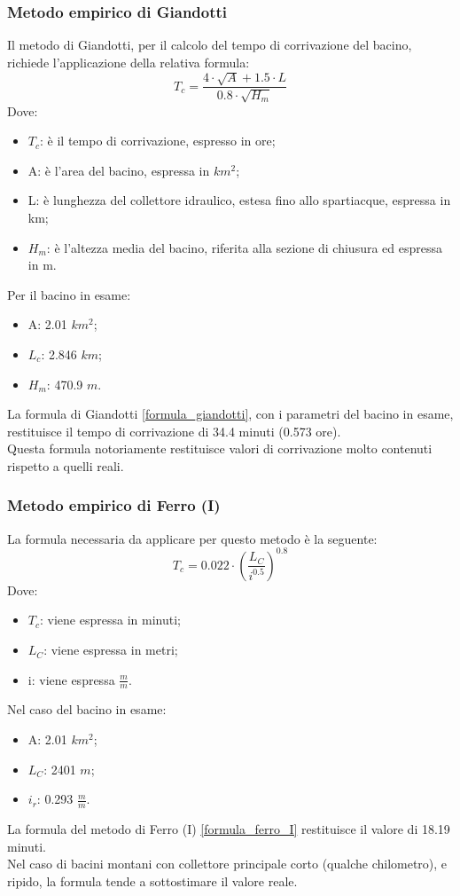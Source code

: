 \subsubsection{Metodo empirico di Giandotti}
Il metodo di Giandotti, per il calcolo del tempo di corrivazione del bacino, richiede l'applicazione della relativa formula:
\begin{equation}
    T_c = \frac{4 \cdot \sqrt{A}+ 1.5 \cdot L}{0.8 \cdot \sqrt{H_m}}
\label{formula_giandotti}
\end{equation}
Dove: 
\begin{itemize}
    \item $T_c$: è il tempo di corrivazione, espresso in ore;
    \item A: è l'area del bacino, espressa in $km^2$;
    \item L: è lunghezza del collettore idraulico, estesa fino allo spartiacque, espressa in km;
    \item $H_m$: è l'altezza media del bacino, riferita alla sezione di chiusura ed espressa in m.
\end{itemize}
Per il bacino in esame:
\begin{itemize}
    \item A: 2.01 $km^2$;
    \item $L_c$: 2.846 $km$;
    \item $H_m$: 470.9 $m$.
\end{itemize}
La formula di Giandotti \ref{formula_giandotti}, con i parametri del bacino in esame, restituisce il tempo di corrivazione di 34.4 minuti (0.573 ore).\\
Questa formula notoriamente restituisce valori di corrivazione molto contenuti rispetto a quelli reali.

\subsubsection{Metodo empirico di Ferro (I)}
La formula necessaria da applicare per questo metodo è la seguente:
\begin{equation}
    T_c = 0.022 \cdot \left(\frac{L_C}{i^{0.5}}\right)^{0.8}
    \label{formula_ferro_I}
\end{equation}
Dove: 
\begin{itemize}
    \item $T_c$: viene espressa in minuti;
    \item $L_C$: viene espressa in metri;
    \item i: viene espressa $\frac{m}{m}$.
\end{itemize}
Nel caso del bacino in esame:
\begin{itemize}
    \item A: 2.01 $km^2$;
    \item $L_C$: 2401 $m$;
    \item $i_r$: 0.293 $\frac{m}{m}$.
\end{itemize}
La formula del metodo di Ferro (I) \ref{formula_ferro_I} restituisce il valore di 18.19 minuti.\\
Nel caso di bacini montani con collettore principale corto (qualche chilometro), e ripido, la formula tende a sottostimare il valore reale.

